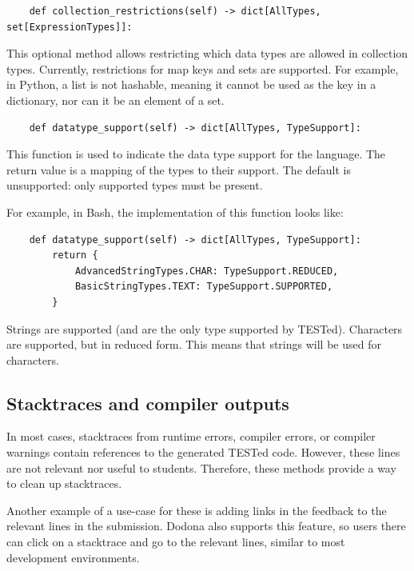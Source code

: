 \documentclass[../main]{subfiles}
\begin{document}
\begin{verbatim}
    def collection_restrictions(self) -> dict[AllTypes, set[ExpressionTypes]]:
\end{verbatim}

This optional method allows restricting which data types are allowed in collection types.
Currently, restrictions for map keys and sets are supported.
For example, in Python, a list is not hashable, meaning it cannot be used as the key in a dictionary, nor can it be an element of a set.

\begin{verbatim}
    def datatype_support(self) -> dict[AllTypes, TypeSupport]:
\end{verbatim}

This function is used to indicate the data type support for the language.
The return value is a mapping of the types to their support.
The default is unsupported: only supported types must be present.

For example, in Bash, the implementation of this function looks like:

\begin{verbatim}
    def datatype_support(self) -> dict[AllTypes, TypeSupport]:
        return {
            AdvancedStringTypes.CHAR: TypeSupport.REDUCED,
            BasicStringTypes.TEXT: TypeSupport.SUPPORTED,
        }
\end{verbatim}

Strings are supported (and are the only type supported by TESTed).
Characters are supported, but in reduced form.
This means that strings will be used for characters.

\subsection{Stacktraces and compiler outputs}\label{subsec:error-messages-and-compiler-outputs}

In most cases, stacktraces from runtime errors, compiler errors, or compiler warnings contain references to the generated TESTed code.
However, these lines are not relevant nor useful to students.
Therefore, these methods provide a way to clean up stacktraces.

Another example of a use-case for these is adding links in the feedback to the relevant lines in the submission.
Dodona also supports this feature, so users there can click on a stacktrace and go to the relevant lines, similar to most development environments.
\end{document}
